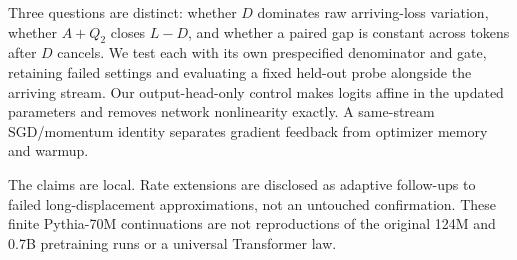 Three questions are distinct: whether \(D\) dominates raw arriving-loss variation, whether \(A+Q_2\) closes \(L-D\), and whether a paired gap is constant across tokens after \(D\) cancels.  We test each with its own prespecified denominator and gate, retaining failed settings and evaluating a fixed held-out probe alongside the arriving stream.  Our output-head-only control makes logits affine in the updated parameters and removes network nonlinearity exactly.  A same-stream SGD/momentum identity separates gradient feedback from optimizer memory and warmup.

The claims are local.  Rate extensions are disclosed as adaptive follow-ups to failed long-displacement approximations, not an untouched confirmation.  These finite Pythia-70M continuations are not reproductions of the original 124M and 0.7B pretraining runs or a universal Transformer law.
